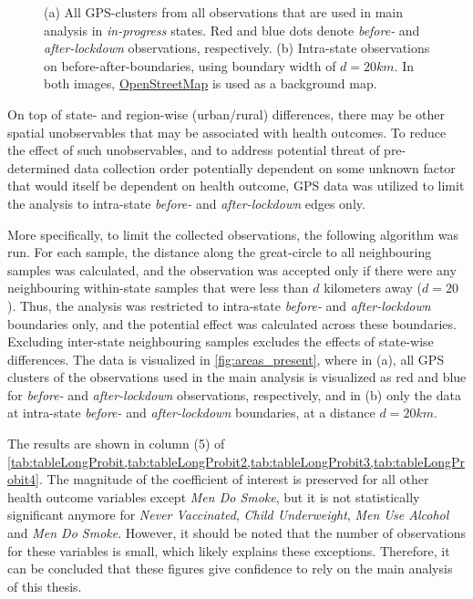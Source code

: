 \documentclass[12pt,a4paper,notitlepage]{article}
\begin{document}
\begin{figure}
\begin{subfigure}{.49\textwidth}
\caption{ \label{fig:areas_report}}
\end{subfigure}
\caption{\label{fig:areas} (a) All GPS-clusters from all observations that are used in main analysis in \textit{in-progress} states. Red and blue dots denote \textit{before-} and \textit{after-lockdown} observations, respectively. (b) Intra-state observations on before-after-boundaries, using boundary width of $d=20km$. In both images, \href{https://www.openstreetmap.org/copyright}{OpenStreetMap} is used as a background map.}
\end{figure}

On top of state- and region-wise (urban/rural) differences, there may be other spatial unobservables that may be associated with health outcomes. To reduce the effect of such unobservables, and to address potential threat of pre-determined data collection order potentially dependent on some unknown factor that would itself be dependent on health outcome, GPS data was utilized to limit the analysis to intra-state\textit{ before-} and \textit{after-lockdown} edges only.

More specifically, to  limit the collected observations, the following algorithm was run. For each sample, the distance along the great-circle to all neighbouring samples was calculated, and the observation was accepted only if there were any neighbouring within-state samples that were less than $d$ kilometers away ($d=20$). Thus, the analysis was restricted to intra-state \textit{before-} and \textit{after-lockdown} boundaries only, and the potential effect was calculated across these boundaries. Excluding inter-state neighbouring samples excludes the effects of state-wise differences. The data is visualized in \cref{fig:areas_present}, where in (a), all GPS clusters of the observations used in the main analysis is visualized as red and blue for \textit{before-} and \textit{after-lockdown} observations, respectively, and in (b) only the data at intra-state \textit{before-} and \textit{after-lockdown} boundaries, at a distance $d=20km$.

The results are shown in column (5) of \cref{tab:tableLongProbit,tab:tableLongProbit2,tab:tableLongProbit3,tab:tableLongProbit4}. The magnitude of the coefficient of interest is preserved for all other health outcome variables except \textit{Men Do Smoke}, but it is not statistically significant anymore for \textit{Never Vaccinated}, \textit{Child Underweight}, \textit{Men Use Alcohol} and \textit{Men Do Smoke}. However, it should be noted that the number of observations for these variables is small, which likely explains these exceptions. Therefore, it can be concluded that these figures give confidence to rely on the main analysis of this thesis.
\end{document}
